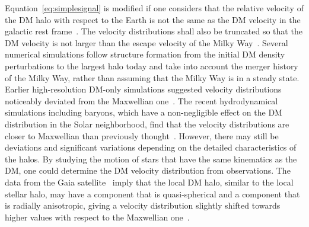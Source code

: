 Equation~\eqref{eq:simplesignal} 
is modified if one considers that the relative velocity of the DM halo with 
respect to the Earth is not the same as the DM velocity in the galactic rest 
frame~\cite{SignalLineShapeI}. The velocity distributions shall also be 
truncated so that the DM velocity is not larger than the escape velocity of 
the Milky Way~\cite{Lisanti:2016jxe}. 
Several numerical simulations follow structure formation from the initial DM 
density perturbations to the largest halo today and take into account the 
merger history of the Milky Way, rather than assuming that the Milky Way is 
in a steady state. 
Earlier high-resolution DM-only simulations suggested velocity 
distributions noticeably deviated from the Maxwellian 
one~\cite{PDG,Lisanti:2016jxe,Green:2017odb}. 
The recent hydrodynamical simulations including baryons, 
which have a non-negligible effect on the DM distribution 
in the Solar neighborhood, find that 
the velocity distributions are closer to Maxwellian than 
 previously thought~\cite{PDG,Green:2017odb}. However, there may still be 
deviations and significant variations depending on the detailed 
characteristics of the halos. 
By studying the motion of stars that have the same kinematics as the DM, 
one could determine the DM velocity distribution from observations. 
The data from the Gaia satellite~\cite{GAIA} imply that the local DM halo, 
similar to the local stellar halo, may have 
a component that is quasi-spherical and a component that is radially anisotropic, 
giving a velocity distribution slightly shifted towards higher values 
with respect to the Maxwellian one~\cite{Evans:2018bqy}.  

